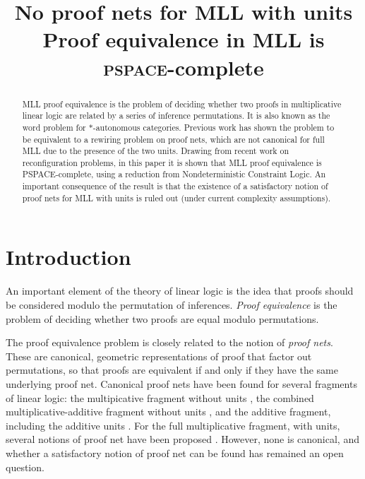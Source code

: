\documentclass[conference,onecolumn]{IEEEtran}
\author{
  \IEEEauthorblockN{Willem Heijltjes}
  \IEEEauthorblockA{
  		University of Bath
	\\	Claverton Down
	\\	Bath BA2~7AY
	\\	w.b.heijltjes@bath.ac.uk
	}
\and
  \IEEEauthorblockN{Robin Houston}
  \IEEEauthorblockA{
		Kiln Enterprises
	\\	robin@kiln.it
	}
}
\title{No proof nets for MLL with units\\[5pt]\Large Proof equivalence in MLL is \textsc{pspace}-complete}
\begin{document}
\maketitle

\begin{abstract}
MLL proof equivalence is the problem of deciding whether two proofs in multiplicative linear logic are related by a series of inference permutations.
%
It is also known as the word problem for $*$-autonomous categories.
%
Previous work has shown the problem to be equivalent to a rewiring problem on proof nets, which are not canonical for full MLL due to the presence of the two units.
%
Drawing from recent work on reconfiguration problems, in this paper it is shown that MLL proof equivalence is PSPACE-complete, using a reduction from Nondeterministic Constraint Logic.
%
An important consequence of the result is that the existence of a satisfactory notion of proof nets for MLL with units is ruled out (under current complexity assumptions).
\end{abstract}



\section{Introduction}


An important element of the theory of linear logic \cite{Girard-1987} is the idea that proofs should be considered modulo the permutation of inferences.
%
%
\emph{Proof equivalence} is the problem of deciding whether two proofs are equal modulo permutations.


The proof equivalence problem is closely related to the notion of \emph{proof nets}.
%
These are canonical, geometric representations of proof that factor out permutations, so that proofs are equivalent if and only if they have the same underlying proof net.
%
Canonical proof nets have been found for several fragments of linear logic: the multipicative fragment without units \cite{Girard-1987,Danos-Regnier-1989}, the combined multiplicative-additive fragment without units \cite{Hughes-vanGlabbeek-2005}, and the additive fragment, including the additive units \cite{Heijltjes-2011}.
%
For the full multiplicative fragment, with units, several notions of proof net have been proposed \cite{BCST,Strassburger-lamarche-2004,HughesFreeStar}.
%
However, none is canonical, and whether a satisfactory notion of proof net can be found has remained an open question.
\end{document}
